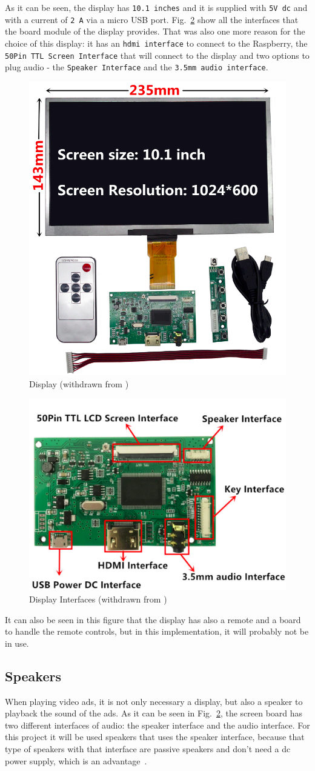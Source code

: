 As it can be seen, the display has \texttt{10.1 inches} and it is supplied with \texttt{5V \gls{dc}} and with a current of \texttt{2 A} via a micro USB port.
Fig.~\ref{fig:screen-interfaces} show all the interfaces that the board module of the display provides. That was also one more reason for the choice of this display: it has an \texttt{\gls{hdmi} interface} to connect to the Raspberry, the \texttt{50Pin TTL Screen Interface} that will connect to the display and two options to plug audio - the \texttt{Speaker Interface} and the \texttt{3.5mm audio interface}.
%
\begin{figure}[htb!]
\centering
    \includegraphics[width=0.4\columnwidth]{./img/screen.png}
  \caption{Display (withdrawn from \cite{screen})}%
\label{fig:screen}
\end{figure}
%
\begin{figure}[htb!]
\centering
    \includegraphics[width=0.6\columnwidth]{./img/screen-interfaces.png}
  \caption{Display Interfaces (withdrawn from \cite{screen})}%
\label{fig:screen-interfaces}
\end{figure}

It can also be seen in this figure that the display has also a remote and a board to handle the remote controls, but in this implementation, it will probably not be in use.

\subsection{Speakers}
When playing video ads, it is not only necessary a display, but also a speaker to playback the sound of the ads.
As it can be seen in Fig.~\ref{fig:screen-interfaces}, the screen board has two different interfaces of audio: the speaker interface and the audio interface.
For this project it will be used speakers that uses the speaker interface, because that type of speakers with that interface are passive speakers and don't need a \gls{dc} power supply, which is an advantage~\cite{passive-speaker}.


